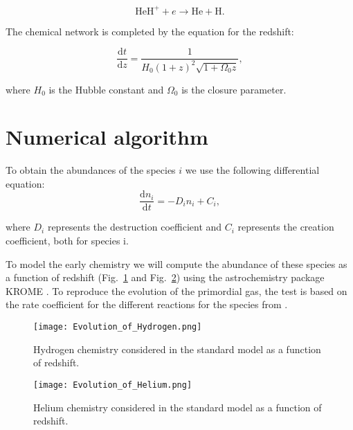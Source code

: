 \documentclass[baaa]{baaa}
\begin{document}
\begin{equation}\label{dissociative recombination}
    \mathrm{HeH^+} + e \longrightarrow \mathrm{He} + \mathrm{H}.
\end{equation}
 

The chemical network is completed by  the equation for the redshift: 

\begin{equation}                                      \frac{\mathrm{d}t}{\mathrm{d}z}= \frac{1}{H_0(1+z)^2 \sqrt{1 + \Omega_0 z}},                                                                  \end{equation} 


where $H_0$ is the Hubble constant and $\Omega_0$ is the closure parameter. 

\section{Numerical algorithm}

To obtain the abundances of the species $i$ we use the following differential equation:
\begin{equation}
    \frac{\mathrm{d}n_i}{\mathrm{d}t} =- D_i n_i+ C_i \label{rate equation},
\end{equation}

where $D_i$ represents the destruction coefficient and $C_i$ represents the creation coefficient, both for species i.




To model the early chemistry
we will compute the abundance of these species as a function of redshift (Fig.~\ref{EvHydrogen} and Fig.~\ref{EvHelium}) using the astrochemistry package \textsc{KROME} \citet{Grassi2014}. 
To reproduce the evolution of the primordial gas, the test is based on the rate coefficient for the different reactions for the species from \citet{GP98}. 


\begin{figure}[h!]
    \centering
    \texttt{[image: Evolution\_of\_Hydrogen.png]}
    \caption{Hydrogen chemistry considered in the standard model as a function of redshift.}
    \label{EvHydrogen}
\end{figure}

\begin{figure}[h!]
    \centering
    \texttt{[image: Evolution\_of\_Helium.png]}
    \caption{Helium chemistry considered in the standard model as a function of redshift.}
    \label{EvHelium}
\end{figure}
\end{document}
